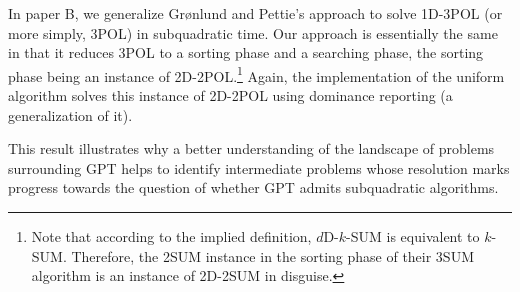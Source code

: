 In paper B, we generalize Gr\o nlund and Pettie's approach to solve 1D-3POL (or
more simply, 3POL) in subquadratic time. Our approach is essentially the same
in that it reduces 3POL to a sorting phase and a searching phase, the sorting
phase being an instance of 2D-2POL.\footnote{Note that according to the implied
definition, \(d\)D-\(k\)-SUM is equivalent to \(k\)-SUM. Therefore, the 2SUM
instance in the sorting phase of their 3SUM algorithm is an instance of 2D-2SUM
in disguise.} Again, the implementation of the uniform algorithm solves this
instance of 2D-2POL using dominance reporting (a generalization of it).

This result illustrates why a better understanding of the landscape of problems
surrounding GPT helps to identify intermediate problems whose resolution marks
progress towards the question of whether GPT admits subquadratic algorithms.
